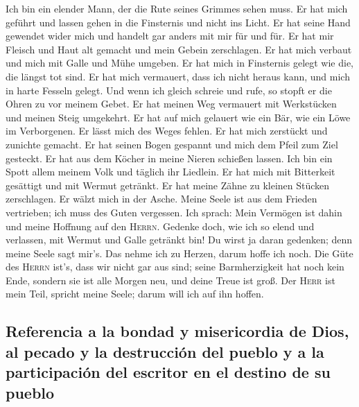  Ich bin ein elender Mann, der die Rute seines Grimmes
sehen muss.  Er hat mich geführt und lassen gehen in die
Finsternis und nicht ins Licht.  Er hat seine Hand
gewendet wider mich und handelt gar anders mit mir für und für.
 Er hat mir Fleisch und Haut alt gemacht und mein Gebein
zerschlagen.  Er hat mich verbaut und mich mit Galle und
Mühe umgeben.  Er hat mich in Finsternis gelegt wie die,
die längst tot sind.  Er hat mich vermauert, dass ich
nicht heraus kann, und mich in harte Fesseln gelegt.  Und
wenn ich gleich schreie und rufe, so stopft er die Ohren zu vor meinem
Gebet.  Er hat meinen Weg vermauert mit Werkstücken und
meinen Steig umgekehrt.  Er hat auf mich gelauert wie ein
Bär, wie ein Löwe im Verborgenen.  Er lässt mich des
Weges fehlen. Er hat mich zerstückt und zunichte gemacht.
 Er hat seinen Bogen gespannt und mich dem Pfeil zum Ziel
gesteckt.  Er hat aus dem Köcher in meine Nieren schießen
lassen.  Ich bin ein Spott allem meinem Volk und täglich
ihr Liedlein.  Er hat mich mit Bitterkeit gesättigt und
mit Wermut getränkt.  Er hat meine Zähne zu kleinen
Stücken zerschlagen. Er wälzt mich in der Asche.  Meine
Seele ist aus dem Frieden vertrieben; ich muss des Guten vergessen.
 Ich sprach: Mein Vermögen ist dahin und meine Hoffnung
auf den \textsc{Herrn}.  Gedenke doch, wie ich so elend
und verlassen, mit Wermut und Galle getränkt bin!  Du
wirst ja daran gedenken; denn meine Seele sagt mir's. 
Das nehme ich zu Herzen, darum hoffe ich noch.  Die Güte
des \textsc{Herrn} ist's, dass wir nicht gar aus sind; seine
Barmherzigkeit hat noch kein Ende,  sondern sie ist alle
Morgen neu, und deine Treue ist groß.  Der \textsc{Herr}
ist mein Teil, spricht meine Seele; darum will ich auf ihn hoffen.

\hypertarget{referencia-a-la-bondad-y-misericordia-de-dios-al-pecado-y-la-destrucciuxf3n-del-pueblo-y-a-la-participaciuxf3n-del-escritor-en-el-destino-de-su-pueblo}{%
\subsection{Referencia a la bondad y misericordia de Dios, al pecado y
la destrucción del pueblo y a la participación del escritor en el
destino de su
pueblo}\label{referencia-a-la-bondad-y-misericordia-de-dios-al-pecado-y-la-destrucciuxf3n-del-pueblo-y-a-la-participaciuxf3n-del-escritor-en-el-destino-de-su-pueblo}}

